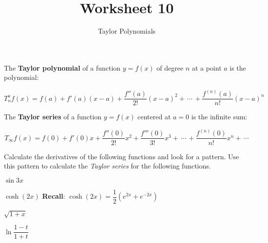 \documentclass[paper=letter, 11pt]{article}
\title{Worksheet 10}
\subtitle{Taylor Polynomials}
\begin{document}
\maketitle

\begin{tcolorbox}[title=Definition: Taylor Polynomials,fonttitle=\bfseries\rmfamily]
	The \textbf{Taylor polynomial} of a function $y = f(x)$ of degree $n$ at a point $a$ is the polynomial:
	
	\[ T^a_n f(x) = f(a) + f'(a)(x - a) + \dfrac{f''(a)}{2!}(x-a)^2 + \,\cdots\, + \dfrac{f^(n)(a)}{n!}(x - a)^n \]
	
	The \textbf{Taylor series} of a function $y = f(x)$ centered at $a = 0$ is the infinite sum:
	
	\[ T_{\infty} f(x) = f(0) + f'(0)x + \dfrac{f''(0)}{2!}x^2 + \dfrac{f'''(0)}{3!}x^3 + \,\cdots\, + \dfrac{f^{(n)}(0)}{n!}x^n +\, \cdots \]
\end{tcolorbox}

Calculate the derivatives of the following functions and look for a pattern.  Use this pattern to calculate the \textit{Taylor series} for the following functions.\bigskip

\Prob $\sin 3x$ \vfill

\Prob $\cosh(2x)$ \hfill \textbf{Recall}: $\cosh(2x) = \dfrac{1}{2}\left(e^{2x} + e^{-2x}\right)$ \vfill

\newpage

\Prob $\sqrt{1 + x}$ \vfill

\Prob $\ln \dfrac{1 - t}{1 + t}$ \vfill
\end{document}
